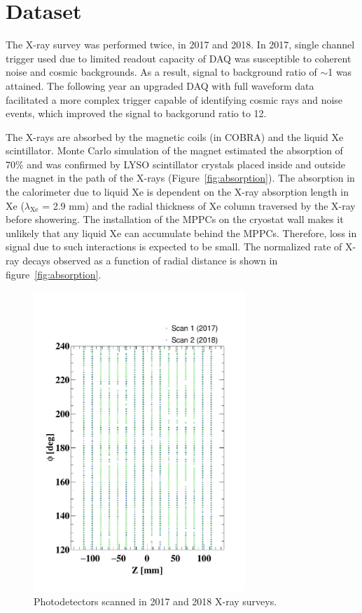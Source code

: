 \section{\label{sec5}Dataset}
The X-ray survey was performed twice, in 2017 and 2018.  In 2017,
single channel trigger used due to limited readout capacity of
DAQ was susceptible to coherent noise and cosmic backgrounds. As a
result, signal to background ratio of $\sim$1 was attained.  The
following year an upgraded DAQ with full waveform data facilitated a
more complex trigger capable of identifying
cosmic rays and noise events, which improved the signal to backgorund ratio
to 12.

The X-rays are absorbed by the magnetic coils (in COBRA) and the
liquid Xe scintillator.  Monte Carlo simulation of the magnet
estimated the absorption of 70\% and was confirmed by LYSO
scintillator crystals placed inside and outside the magnet in the path
of the X-rays (Figure~\ref{fig:absorption}). The absorption in the
calorimeter due to liquid Xe is dependent on the X-ray absorption
length in Xe ($\lambda_{\mathrm{Xe}}$ = 2.9 mm) and the radial
thickness of Xe column traversed by the X-ray before showering.  The
installation of the MPPCs on the cryostat wall makes it unlikely that
any liquid Xe can accumulate behind the MPPCs\cite{megdesign}.
Therefore, loss in signal due to such interactions is expected to be
small.  The normalized rate of X-ray decays observed as a function of
radial distance is shown in figure~\ref{fig:absorption}.

\begin{figure}[]
\centering
\includegraphics[width=8cm]{plots/scanMap}
\caption{Photodetectors scanned in 2017 and 2018 X-ray surveys.}
\label{fig:scanmap} 
\end{figure}  



